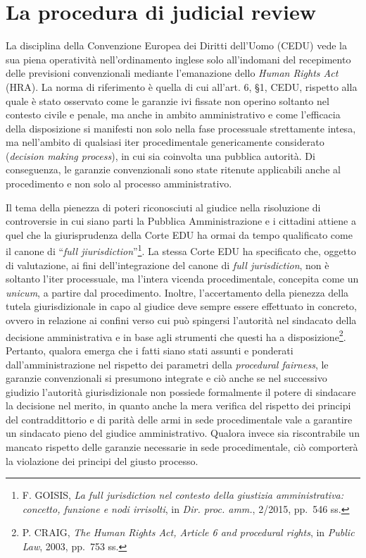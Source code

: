 \documentclass[12pt,it,a4paper,]{report}
\begin{document}
\hypertarget{la-procedura-di-judicial-review}{%
\section{La procedura di judicial
review}\label{la-procedura-di-judicial-review}}

La disciplina della Convenzione Europea dei Diritti dell'Uomo (CEDU)
vede la sua piena operatività nell'ordinamento inglese solo all'indomani
del recepimento delle previsioni convenzionali mediante l'emanazione
dello \emph{Human Rights Act} (HRA). La norma di riferimento è quella di
cui all'art. 6, §1, CEDU, rispetto alla quale è stato osservato come le
garanzie ivi fissate non operino soltanto nel contesto civile e penale,
ma anche in ambito amministrativo e come l'efficacia della disposizione
si manifesti non solo nella fase processuale strettamente intesa, ma
nell'ambito di qualsiasi iter procedimentale genericamente considerato
(\emph{decision making process}), in cui sia coinvolta una pubblica
autorità. Di conseguenza, le garanzie convenzionali sono state ritenute
applicabili anche al procedimento e non solo al processo amministrativo.

Il tema della pienezza di poteri riconosciuti al giudice nella
risoluzione di controversie in cui siano parti la Pubblica
Amministrazione e i cittadini attiene a quel che la giurisprudenza della
Corte EDU ha ormai da tempo qualificato come il canone di ``\emph{full
jiurisdiction}''\footnote{F. GOISIS, \emph{La full jurisdiction nel
  contesto della giustizia amministrativa: concetto, funzione e nodi
  irrisolti}, in \emph{Dir. proc. amm.}, 2/2015, pp.~546 ss.}. La stessa
Corte EDU ha specificato che, oggetto di valutazione, ai fini
dell'integrazione del canone di \emph{full jurisdiction}, non è soltanto
l'iter processuale, ma l'intera vicenda procedimentale, concepita come
un \emph{unicum}, a partire dal procedimento. Inoltre, l'accertamento
della pienezza della tutela giurisdizionale in capo al giudice deve
sempre essere effettuato in concreto, ovvero in relazione ai confini
verso cui può spingersi l'autorità nel sindacato della decisione
amministrativa e in base agli strumenti che questi ha a
disposizione\footnote{P. CRAIG, \emph{The Human Rights Act, Article 6
  and procedural rights}, in \emph{Public Law}, 2003, pp.~753 ss.}.
Pertanto, qualora emerga che i fatti siano stati assunti e ponderati
dall'amministrazione nel rispetto dei parametri della \emph{procedural
fairness}, le garanzie convenzionali si presumono integrate e ciò anche
se nel successivo giudizio l'autorità giurisdizionale non possiede
formalmente il potere di sindacare la decisione nel merito, in quanto
anche la mera verifica del rispetto dei principi del contraddittorio e
di parità delle armi in sede procedimentale vale a garantire un
sindacato pieno del giudice amministrativo. Qualora invece sia
riscontrabile un mancato rispetto delle garanzie necessarie in sede
procedimentale, ciò comporterà la violazione dei principi del giusto
processo.
\end{document}

